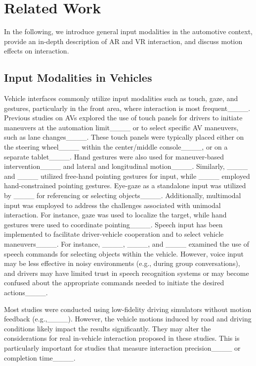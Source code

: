 \section{Related Work}
In the following, we introduce general input modalities in the automotive context, provide an in-depth description of AR and VR interaction, and discuss motion effects on interaction. 

\subsection{Input Modalities in Vehicles}
\label{sec:input-modalities-rw}

Vehicle interfaces commonly utilize input modalities such as touch, gaze, and gestures, particularly in the front area, where interaction is most frequent____. 
Previous studies on AVs explored the use of touch panels for drivers to initiate maneuvers at the automation limit____ or to select specific AV maneuvers, such as lane changes____. These touch panels were typically placed either on the steering wheel____ within the center/middle console____, or on a separate tablet____.
Hand gestures were also used for maneuver-based intervention____ and lateral and longitudinal motion____. 
Similarly, ____ and ____ utilized free-hand pointing gestures for input, while ____ employed hand-constrained pointing gestures.
Eye-gaze as a standalone input was utilized by ____ for referencing or selecting objects____. Additionally, multimodal input was employed to address the challenges associated with unimodal interaction. For instance, gaze was used to localize the target, while hand gestures were used to coordinate pointing____.
Speech input has been implemented to facilitate driver-vehicle cooperation and to select vehicle maneuvers____. For instance, ____, ____, and ____ examined the use of speech commands for selecting objects within the vehicle. However, voice input may be less effective in noisy environments (e.g., during group conversations), and drivers may have limited trust in speech recognition systems or may become confused about the appropriate commands needed to initiate the desired actions____.

Most studies were conducted using low-fidelity driving simulators without motion feedback (e.g.,____). However, the vehicle motions induced by road and driving conditions likely impact the results significantly. They may alter the considerations for real in-vehicle interaction proposed in these studies. This is particularly important for studies that measure interaction precision____ or completion time____.




